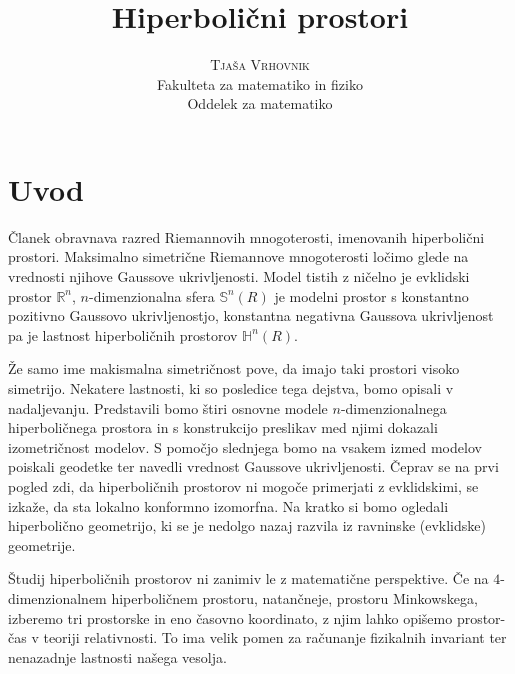 \documentclass[a4paper]{article}
\begin{document}
\title{\Huge\textbf{Hiperbolični prostori}} 
\author{\large\textsc{Tjaša Vrhovnik}\\
	Fakulteta za matematiko in fiziko\\
	Oddelek za matematiko}

\thispagestyle{empty}

\maketitle

\newpage

\tableofcontents

\newpage

\section{Uvod}

Članek obravnava razred Riemannovih mnogoterosti, imenovanih hiperbolični prostori. Maksimalno simetrične Riemannove mnogoterosti ločimo glede na vrednosti njihove Gaussove ukrivljenosti. Model tistih z ničelno je evklidski prostor $\mathbb{R}^{n}$, $n$-dimenzionalna sfera $\mathbb{S}^{n}(R)$ je modelni prostor s konstantno pozitivno Gaussovo ukrivljenostjo, konstantna negativna Gaussova ukrivljenost pa je lastnost hiperboličnih prostorov $\mathbb{H}^{n}(R)$.

Že samo ime makismalna simetričnost pove, da imajo taki prostori visoko simetrijo. Nekatere lastnosti, ki so posledice tega dejstva, bomo opisali v nadaljevanju. Predstavili bomo štiri osnovne modele $n$-dimenzionalnega hiperboličnega prostora in s konstrukcijo preslikav med njimi dokazali izometričnost modelov. S pomočjo slednjega bomo na vsakem izmed modelov poiskali geodetke ter navedli vrednost Gaussove ukrivljenosti. Čeprav se na prvi pogled zdi, da hiperboličnih prostorov ni mogoče primerjati z evklidskimi, se izkaže, da sta lokalno konformno izomorfna. Na kratko si bomo ogledali hiperbolično geometrijo, ki se je nedolgo nazaj razvila iz ravninske (evklidske) geometrije. 

Študij hiperboličnih prostorov ni zanimiv le z matematične perspektive. Če na $4$-dimenzionalnem hiperboličnem prostoru, natančneje, prostoru Minkowskega, izberemo tri prostorske in eno časovno koordinato, z njim lahko opišemo prostor-čas v teoriji relativnosti. To ima velik pomen za računanje fizikalnih invariant ter nenazadnje lastnosti našega vesolja. 
\end{document}
